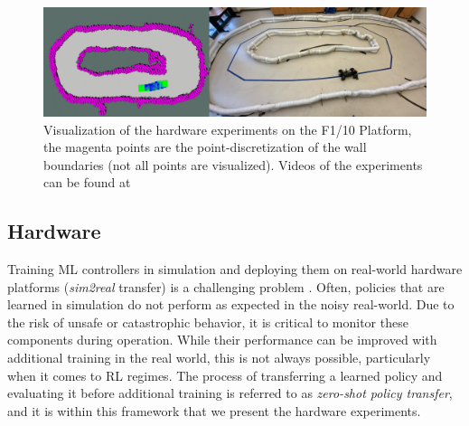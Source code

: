 \documentclass[manuscript,screen,review]{acmart}
\begin{document}
\begin{figure}[tbhp]%
  \centering
  \includegraphics[width=\linewidth]{figures/sidebyside_comparison.pdf}
  \caption{Visualization of the hardware experiments on the F1/10 Platform, the magenta points are the point-discretization of the wall boundaries (not all points are visualized). Videos of the experiments can be found at}
  \label{fig:lab_setup}
\end{figure}%

\subsection{Hardware}
Training ML controllers in simulation and deploying them on real-world hardware platforms (\textit{sim2real} transfer) is a challenging problem \cite{jang2019ICCPS, kadian2019we}. Often, policies that are learned in simulation do not perform as expected in the noisy real-world. Due to the risk of unsafe or catastrophic behavior, it is critical to monitor these components during operation. While their performance can be improved with additional training in the real world, this is not always possible, particularly when it comes to RL regimes. The process of transferring a learned policy and evaluating it before additional training is referred to as \emph{zero-shot policy transfer}, and it is within this framework that we present the hardware experiments.
\end{document}
